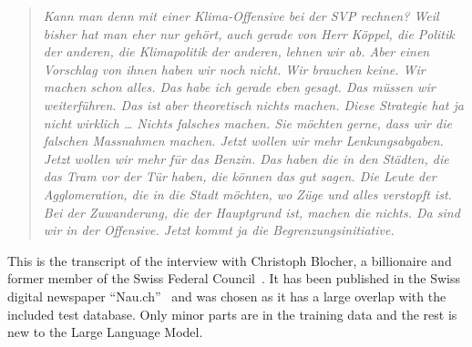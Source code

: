 \documentclass[a4paper,11pt]{report}
\newenvironment{itquote}
	{\begin{quote}\itshape}
	{\end{quote}\ignorespacesafterend}
\begin{document}
\begin{itquote}
				Kann man denn mit einer Klima-Offensive bei der SVP rechnen?
				Weil bisher hat man eher nur gehört, auch gerade von Herr Köppel, die Politik der anderen, die Klimapolitik der anderen, lehnen wir ab.
				Aber einen Vorschlag von ihnen haben wir noch nicht.
				Wir brauchen keine.
				Wir machen schon alles.
				Das habe ich gerade eben gesagt.
				Das müssen wir weiterführen.
				Das ist aber theoretisch nichts machen.
				Diese Strategie hat ja nicht wirklich \ldots
				Nichts falsches machen.
				Sie möchten gerne, dass wir die falschen Massnahmen machen.
				Jetzt wollen wir mehr Lenkungsabgaben.
				Jetzt wollen wir mehr für das Benzin.
				Das haben die in den Städten, die das Tram vor der Tür haben, die können das gut sagen.
				Die Leute der Agglomeration, die in die Stadt möchten, wo Züge und alles verstopft ist.
				Bei der Zuwanderung, die der Hauptgrund ist, machen die nichts.
				Da sind wir in der Offensive.
				Jetzt kommt ja die Begrenzungsinitiative.
			\end{itquote}
	        This is the transcript of the interview with Christoph Blocher, a billionaire and former member of the Swiss Federal Council~\cite{blocher}.
	        It has been published in the Swiss digital newspaper \enquote{Nau.ch}~\cite{baerlocher2019} and was chosen as it has a large overlap with the included test database.
	        Only minor parts are in the training data and the rest is new to the Large Language Model.
\end{document}
